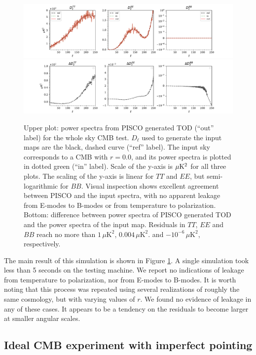 \documentclass[a4paper,11pt]{article}
\begin{document}
\begin{figure}
	\centering
	\includegraphics[width=1\textwidth, trim = {2.2cm 0.0cm 2.3cm 0.0cm}, clip ]{figures/whole_sky.pdf}
	\includegraphics[width=1\textwidth, trim = {2.2cm 0.0cm 2.3cm 0.0cm}, clip ]{figures/whole_sky_res.pdf}
	\caption{Upper plot: power spectra from PISCO generated TOD (``out'' label) for the whole sky CMB test. $D_\ell$ used to generate the input maps are the black, dashed curve (``ref'' label). The input sky corresponds to a CMB with $r=0.0$, and its power spectra is plotted in dotted green (``in'' label). Scale of the y-axis is $\mu\rm{K}^2$ for all three plots. The scaling of the y-axis is linear for $TT$ and $EE$, but semi-logarithmic for $BB$.  Visual inspection shows excellent agreement between PISCO and the input spectra, with no apparent leakage from E-modes to B-modes or from temperature to polarization. Bottom: difference between power spectra of PISCO generated TOD and the power spectra of the input map. Residuals in $TT$, $EE$ and $BB$ reach no more than $1\, \mu\mathrm{K}^2$, $ 0.004\, \mu\mathrm{K}^2$. and $-10^{-6} \, \mu\mathrm{K}^2$, respectively.}
	\label{fig::pisco4wholesky}
\end{figure}

The main result of this simulation is shown in Figure \ref{fig::pisco4wholesky}. A single simulation took less than 5 seconds on the testing machine. We report no indications of leakage from temperature to polarization, nor from E-modes to B-modes. It is worth noting that this process was repeated using several realizations of roughly the same cosmology, but with varying values of $r$. We found no evidence of leakage in any of these cases. It appears to be a tendency on the residuals to become larger at smaller angular scales. 

\subsection{Ideal CMB experiment with imperfect pointing}
\label{subsec::ideal_full_sky_offsets}
\end{document}
